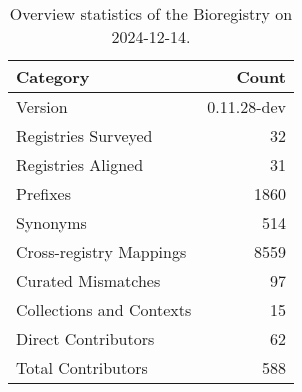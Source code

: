 \begin{table}
\caption{Overview statistics of the Bioregistry on 2024-12-14.}
\label{tab:bioregistry-summary}
\begin{tabular}{lr}
\toprule
Category & Count \\
\midrule
Version & 0.11.28-dev \\
Registries Surveyed & 32 \\
Registries Aligned & 31 \\
Prefixes & 1860 \\
Synonyms & 514 \\
Cross-registry Mappings & 8559 \\
Curated Mismatches & 97 \\
Collections and Contexts & 15 \\
Direct Contributors & 62 \\
Total Contributors & 588 \\
\bottomrule
\end{tabular}
\end{table}
